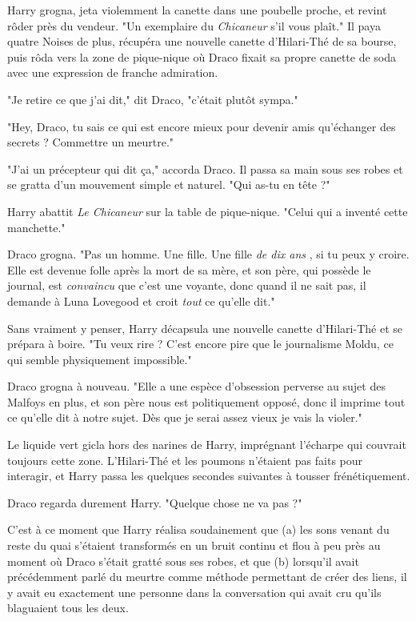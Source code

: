 Harry grogna, jeta violemment la canette dans une poubelle proche, et revint rôder près du vendeur. "Un exemplaire du \emph{Chicaneur}  s'il vous plaît." Il paya quatre Noises de plus, récupéra une nouvelle canette d'Hilari-Thé de sa bourse, puis rôda vers la zone de pique-nique où Draco fixait sa propre canette de soda avec une expression de franche admiration.

"Je retire ce que j'ai dit," dit Draco, "c'était plutôt sympa."

"Hey, Draco, tu sais ce qui est encore mieux pour devenir amis qu'échanger des secrets ? Commettre un meurtre."

"J'ai un précepteur qui dit ça," accorda Draco. Il passa sa main sous ses robes et se gratta d'un mouvement simple et naturel. "Qui as-tu en tête ?"

Harry abattit \emph{Le Chicaneur}  sur la table de pique-nique. "Celui qui a inventé cette manchette."

Draco grogna. "Pas un homme. Une fille. Une fille \emph{de dix ans} , si tu peux y croire. Elle est devenue folle après la mort de sa mère, et son père, qui possède le journal, est \emph{convaincu}  que c'est une voyante, donc quand il ne sait pas, il demande à Luna Lovegood et croit \emph{tout}  ce qu'elle dit."

Sans vraiment y penser, Harry décapsula une nouvelle canette d'Hilari-Thé et se prépara à boire. "Tu veux rire ? C'est encore pire que le journalisme Moldu, ce qui semble physiquement impossible."

Draco grogna à nouveau. "Elle a une espèce d'obsession perverse au sujet des Malfoys en plus, et son père nous est politiquement opposé, donc il imprime tout ce qu'elle dit à notre sujet. Dès que je serai assez vieux je vais la violer."

Le liquide vert gicla hors des narines de Harry, imprégnant l'écharpe qui couvrait toujours cette zone. L'Hilari-Thé et les poumons n'étaient pas faits pour interagir, et Harry passa les quelques secondes suivantes à tousser frénétiquement.

Draco regarda durement Harry. "Quelque chose ne va pas ?"

C'est à ce moment que Harry réalisa soudainement que (a) les sons venant du reste du quai s'étaient transformés en un bruit continu et flou à peu près au moment où Draco s'était gratté sous ses robes, et que (b) lorsqu'il avait précédemment parlé du meurtre comme méthode permettant de créer des liens, il y avait eu exactement une personne dans la conversation qui avait cru qu'ils blaguaient tous les deux.

